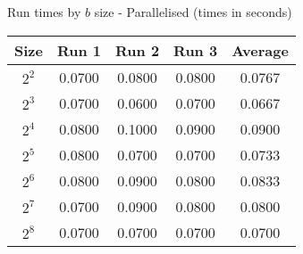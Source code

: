 \centering
\caption{\label{table:matrix_par}Run times by $b$ size - Parallelised (times in seconds)}
\begin{tabular}{@{} c c c c c @{}}
\toprule
    \textbf{Size} & \textbf{Run 1}& \textbf{Run 2}& \textbf{Run 3}& \textbf{Average}\\
\midrule
    $2^2$ & 0.0700 & 0.0800 & 0.0800 & 0.0767\\
\lightrule
    $2^3$ & 0.0700 & 0.0600 & 0.0700 & 0.0667\\
\lightrule
    $2^4$ & 0.0800 & 0.1000 & 0.0900 & 0.0900\\
\lightrule
    $2^5$ & 0.0800 & 0.0700 & 0.0700 & 0.0733\\
\lightrule
    $2^6$ & 0.0800 & 0.0900 & 0.0800 & 0.0833\\
\lightrule
    $2^7$ & 0.0700 & 0.0900 & 0.0800 & 0.0800\\
\lightrule
    $2^8$ & 0.0700 & 0.0700 & 0.0700 & 0.0700\\
\bottomrule
\end{tabular}
